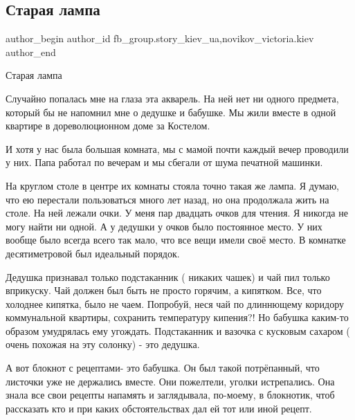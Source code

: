  
 
 
 
 
 
\subsection{Старая лампа}
\label{sec:13_12_2021.fb.fb_group.story_kiev_ua.1.staraja_lampa}
 
\ifcmt
 author_begin
   author_id fb_group.story_kiev_ua,novikov_victoria.kiev
 author_end
\fi

Старая лампа 

Случайно попалась мне на глаза эта акварель. На ней нет ни одного предмета,
который бы не напомнил мне о дедушке и бабушке. Мы жили вместе в одной квартире
в дореволюционном доме за Костелом. 


И хотя у нас была большая комната, мы с мамой почти каждый вечер проводили у
них. Папа работал по вечерам и мы сбегали от шума печатной  машинки.

На круглом столе в центре их комнаты стояла точно такая же лампа. Я думаю, что
ею перестали пользоваться много лет назад, но она продолжала жить на столе.  На
ней лежали очки. У меня пар двадцать очков для чтения. Я никогда не могу найти
ни одной. А у дедушки у очков было постоянное место. У них вообще было всегда
всего так мало, что все вещи имели своё место. В комнатке десятиметровой был
идеальный порядок.

Дедушка признавал только подстаканник ( никаких чашек) и чай пил только
вприкуску. Чай должен был быть не просто горячим, а кипятком. Все, что холоднее
кипятка, было не чаем. Попробуй, неся чай по длиннющему коридору коммунальной
квартиры, сохранить температуру кипения?! Но бабушка каким-то образом
умудрялась ему угождать. Подстаканник и вазочка с кусковым сахаром ( очень
похожая на эту солонку) - это дедушка.  

А вот блокнот с рецептами- это бабушка. Он был такой потрёпанный, что листочки
уже не держались вместе. Они пожелтели, уголки истрепались. Она знала все свои
рецепты напамять и заглядывала, по-моему, в блокнотик, чтоб рассказать кто и
при каких обстоятельствах дал ей тот или иной рецепт. 

